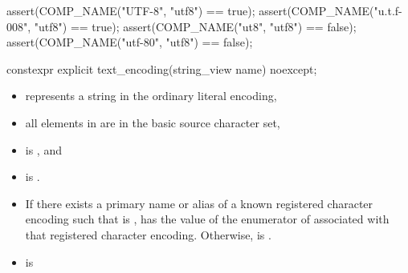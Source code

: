 \documentclass{wg21}
\begin{document}
\begin{addedblock}
\begin{example}
\begin{codeblock}
    assert(COMP_NAME("UTF-8", "utf8") == true);
    assert(COMP_NAME("u.t.f-008", "utf8") == true);
    assert(COMP_NAME("ut8", "utf8") == false);
    assert(COMP_NAME("utf-80", "utf8") == false);
\end{codeblock}
\end{example}



\begin{itemdecl}
constexpr explicit text_encoding(string_view name) noexcept;
\end{itemdecl}

\begin{itemdescr}
    \preconditions
    \begin{itemize}
        \item {} represents a string in the ordinary literal encoding,
        \item all elements in  are in the basic source character set,
        \item {} is , and
        \item {} is .
    \end{itemize}
    \postconditions
    \begin{itemize}
         \item If there exists a primary name or alias  of a known registered character encoding such that  is ,  has the value of the enumerator of  associated with that registered character encoding. Otherwise,  is .
         \item  {} is 
    \end{itemize}
\end{itemdescr}



\end{addedblock}
\end{document}
